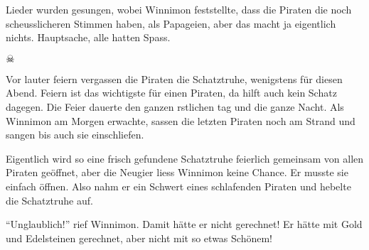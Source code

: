 Lieder wurden gesungen, wobei Winnimon feststellte, dass die Piraten die noch scheusslicheren Stimmen haben, als Papageien, aber das macht ja eigentlich nichts. Hauptsache, alle hatten Spass.


\begin{center}
{ $\skull$}
\end{center}

Vor lauter feiern vergassen die Piraten die Schatztruhe, wenigstens für diesen Abend. Feiern ist das wichtigste für einen Piraten, da hilft auch kein Schatz dagegen. Die Feier dauerte den ganzen rstlichen tag und die ganze Nacht. Als Winnimon am Morgen erwachte, sassen die letzten Piraten noch am Strand und sangen bis auch sie einschliefen.

Eigentlich wird so eine frisch gefundene Schatztruhe feierlich gemeinsam von allen Piraten geöffnet, aber die Neugier liess Winnimon keine Chance. Er musste sie einfach öffnen. Also nahm er ein Schwert eines schlafenden Piraten und hebelte die Schatztruhe auf.

\enquote{Unglaublich!} rief Winnimon. Damit hätte er nicht gerechnet! Er hätte mit Gold und Edelsteinen gerechnet, aber nicht mit so etwas Schönem! \hfill {\color{red}\decofourleft}
